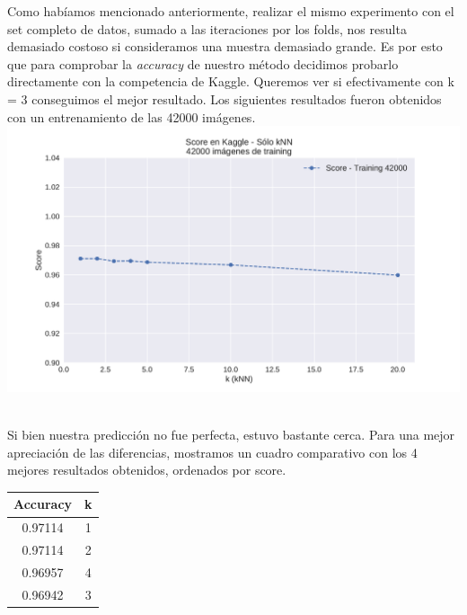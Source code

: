 Como habíamos mencionado anteriormente, realizar el mismo experimento con el set completo de datos, sumado a las iteraciones por los folds, nos resulta demasiado costoso si consideramos una muestra demasiado grande. Es por esto que para comprobar la \textit{accuracy} de nuestro método decidimos probarlo directamente con la competencia de Kaggle. Queremos ver si efectivamente con k = 3 conseguimos el mejor resultado. Los siguientes resultados fueron obtenidos con un entrenamiento de las 42000 imágenes.\\

{\centering
    \includegraphics[scale=0.60]{informe/imagenes/knn/kaggleknn.pdf} \\
}
$ $\newline

Si bien nuestra predicción no fue perfecta, estuvo bastante cerca. Para una mejor apreciación de las diferencias, mostramos un cuadro comparativo con los 4 mejores resultados obtenidos, ordenados por score. \\

\begin{center}
    \begin{tabular}{| c | c |}
    \hline
     Accuracy    & k  \\ \hline
     0.97114  & 1  \\ \hline
     0.97114  & 2  \\ \hline
     0.96957  & 4  \\ \hline
     0.96942  & 3  \\ \hline
    \end{tabular}
\end{center}


